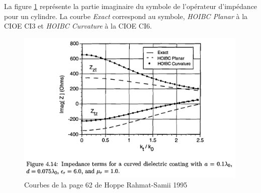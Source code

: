 La figure \ref{fig:annex:hoppe:p62} représente la partie imaginaire du symbole de l'opérateur d'impédance  pour un cylindre. La courbe \textit{Exact} correspond au symbole, \textit{HOIBC Planar} à la CIOE CI3 et \textit{HOIBC Curvature} à la CIOE CI6.

\begin{figure}[h!tb]
    \includegraphics[width=0.99\textwidth]{images/hoppe/p62_imp_cylindre.png}
    \caption{Courbes de la page 62 de Hoppe Rahmat-Samii 1995}
    \label{fig:annex:hoppe:p62}
\end{figure}
